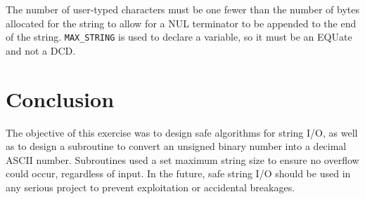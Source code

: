 \documentclass[CMPE]{KGCOEReport}
\begin{document}
The number of user-typed characters must be one fewer than the number of bytes
allocated for the string to allow for a NUL terminator to be appended to the
end of the string. \texttt{MAX\_STRING} is used to declare a variable, so it
must be an EQUate and not a DCD.

\section*{Conclusion}

The objective of this exercise was to design safe algorithms for string I/O, as
well as to design a subroutine to convert an unsigned binary number into a
decimal ASCII number. Subroutines used a set maximum string size to ensure
no overflow could occur, regardless of input. In the future, safe string I/O
should be used in any serious project to prevent exploitation or accidental
breakages.


\end{document}
